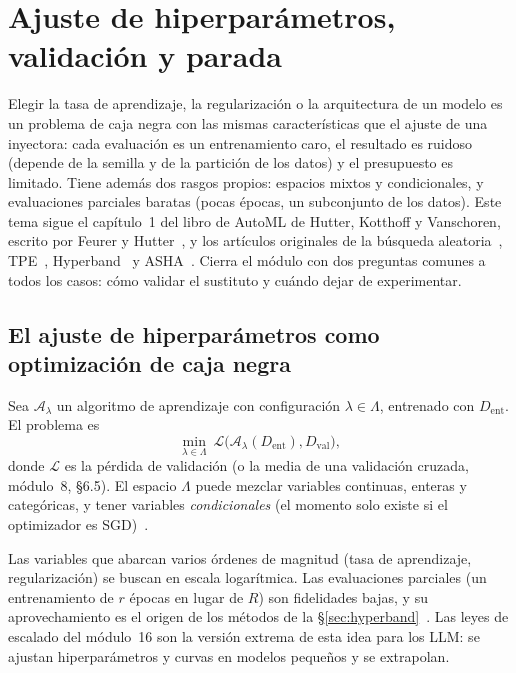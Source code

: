 \chapter{Ajuste de hiperparámetros, validación y parada}
\label{tema:6}

Elegir la tasa de aprendizaje, la regularización o la arquitectura de un modelo es un problema de caja negra con las mismas características que el ajuste de una inyectora: cada evaluación es un entrenamiento caro, el resultado es ruidoso (depende de la semilla y de la partición de los datos) y el presupuesto es limitado. Tiene además dos rasgos propios: espacios mixtos y condicionales, y evaluaciones parciales baratas (pocas épocas, un subconjunto de los datos). Este tema sigue el capítulo~1 del libro de AutoML de Hutter, Kotthoff y Vanschoren, escrito por Feurer y Hutter~\cite{feurer}, y los artículos originales de la búsqueda aleatoria~\cite{bergstra12}, TPE~\cite{tpe}, Hyperband~\cite{hyperband} y ASHA~\cite{asha}. Cierra el módulo con dos preguntas comunes a todos los casos: cómo validar el sustituto y cuándo dejar de experimentar.

\section{El ajuste de hiperparámetros como optimización de caja negra}

\begin{definicion}\label{def:hpo}
Sea $\mathcal A_\lambda$ un algoritmo de aprendizaje con configuración $\lambda\in\Lambda$, entrenado con $D_{\mathrm{ent}}$. El problema es\[\min_{\lambda\in\Lambda}\ \mathcal L\bigl(\mathcal A_\lambda(D_{\mathrm{ent}}),D_{\mathrm{val}}\bigr),\]donde $\mathcal L$ es la pérdida de validación (o la media de una validación cruzada, módulo~8, §6.5). El espacio $\Lambda$ puede mezclar variables continuas, enteras y categóricas, y tener variables \emph{condicionales} (el momento solo existe si el optimizador es SGD)~\cite[§1.2]{feurer}.
\end{definicion}

Las variables que abarcan varios órdenes de magnitud (tasa de aprendizaje, regularización) se buscan en escala logarítmica. Las evaluaciones parciales (un entrenamiento de $r$ épocas en lugar de $R$) son fidelidades bajas, y su aprovechamiento es el origen de los métodos de la §\ref{sec:hyperband}~\cite[§1.4]{feurer}. Las leyes de escalado del módulo~16 son la versión extrema de esta idea para los LLM: se ajustan hiperparámetros y curvas en modelos pequeños y se extrapolan.

